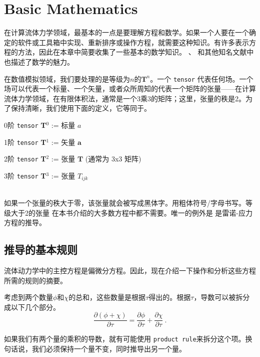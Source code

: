 \documentclass[MathematicsNumericsDerivationsAndOpenFOAM.tex]{subfiles}
\begin{document}


\chapter{Basic Mathematics}
\label{CHAPTER::Mathematics}
%
%
%

	在计算流体力学领域，最基本的一点是要理解方程和数学。如果一个人要在一个确定的软件或工具箱中实现、重新排序或操作方程，就需要这种知识。有许多表示方程的方法，因此在本章中简要收集了一些基本的数学知识。 \cite{JasakPhD, Rappaz, ProgrammersGuide}、 \cite{Moukalled15}和其他知名文献中也描述了数学的魅力。


在数值模拟领域，我们要处理的是等级为$n$的$\textbf{T}^n$。一个  \texttt{tensor} 代表任何场。一个场可以代表一个标量、一个矢量，或者众所周知的代表一个矩阵的张量------在计算流体力学领域，在有限体积法，通常是一个3乘3的矩阵；这里，张量的秩是2。为了保持清晰，我们使用下面的定义，它等同于\cite{ProgrammersGuide}。


%
%
	\vspace{0.5cm}

	0阶 \texttt{tensor} \textbf{T}$^0$ := 标量 $a$

	1阶 \texttt{tensor} \textbf{T}$^1$ := 矢量 $\textbf{a}$

	2阶 \texttt{tensor} \textbf{T}$^2$ := 张量 $\textbf{T}$ (通常为 3x3 矩阵)

	3阶 \texttt{tensor} \textbf{T}$^3$ := 张量 $T_{ijk}$

	~\\
%
%
	如果一个张量的秩大于零，该张量就会被写成黑体字。用粗体符号/字母书写。等级大于2的张量 在本书介绍的大多数方程中都不需要。唯一的例外是 是雷诺-应力方程的推导。
%
%
\section{推导的基本规则}
%
%
	流体动力学中的主控方程是偏微分方程。因此，现在介绍一下操作和分析这些方程所需的规则的摘要。


  	考虑到两个数量$\phi$和$\chi$的总和，这些数量是根据$\tau$得出的。根据$\tau$，导数可以被拆分成以下几个部分。
%
%
\begin{equation}
 \frac{\partial (\phi + \chi)}{\partial \tau}
 =
 \frac{\partial \phi }{\partial \tau} + \frac{\partial \chi}{\partial \tau} ~.
\end{equation}
%
%

如果我们有两个量的乘积的导数，就有可能使用 \texttt{product rule}来拆分这个项。换句话说，我们必须保持一个量不变，同时推导出另一个量。
\end{document}
